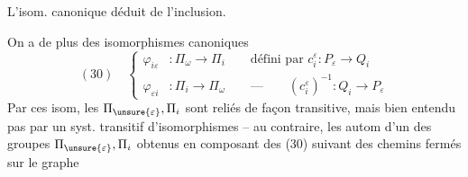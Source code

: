 L'isom. canonique déduit de l'inclusion.

On a de plus des isomorphismes canoniques
\[
(30)\quad\left\{\begin{aligned}
\varphi_{i\varepsilon}&:\Pi_\omega\longrightarrow\Pi_i\qquad\text{défini par }c_i^\varepsilon:P_\varepsilon\longrightarrow Q_i\\
\varphi_{\varepsilon i}&:\Pi_i\longrightarrow\Pi_\omega\qquad\text{---}\qquad(c_i^\varepsilon)^{-1}:Q_i\longrightarrow P_\varepsilon
\end{aligned}\right.
\]
Par ces isom, les $\Pi_{\unsure{\varepsilon}},\Pi_i$ sont reliés de façon transitive, mais bien entendu pas par un syst. transitif d'isomorphismes -- au contraire, les autom d'un des groupes $\Pi_{\unsure{\varepsilon}},\Pi_i$ obtenus en composant des  (30) suivant des chemins fermés sur le graphe
